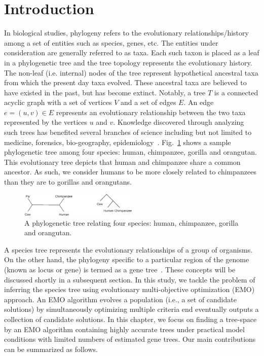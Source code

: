  \section{Introduction}
\label{sec:intro}
In biological studies, phylogeny refers to the evolutionary relationships/history among a set of entities such as species, genes, etc. The entities under consideration are generally referred to as taxa. Each such taxon is placed as a leaf in a phylogenetic tree and the tree topology represents the evolutionary history. The non-leaf (i.e. internal) nodes of the tree represent hypothetical ancestral taxa from which the present day taxa evolved. These ancestral taxa are believed to have existed in the past, but has become extinct. Notably, a tree $T$ is a connected acyclic graph with a set of vertices $V$ and a set of edges $E$. An edge $e = (u, v) \in E$ represents an evolutionary relationship between the two taxa represented by the vertices $u$ and $v$. Knowledge discovered through analyzing such trees has benefited several branches of science including but not limited to medicine, forensics, bio-geography, epidemiology~\cite{felix2015phylogenetics}. 
Fig.~\ref{fig:outgroup} shows a sample phylogenetic tree among four species: human, chimpanzee, gorilla and orangutan. This evolutionary tree depicts that human and chimpanzee share a common ancestor. As such, we consider humans to be more closely related to chimpanzees than they are to gorillas and orangutans.

\begin{figure}[!tb]
	\centering
	\includegraphics[width=0.5\textwidth]{Figure/outgroup.eps}
	\caption{A phylogenetic tree relating four species: human, chimpanzee, gorilla and orangutan. }
	\label{fig:outgroup}
\end{figure}




A species tree represents the evolutionary relationships of a group of organisms. On the other hand, the phylogeny specific to a particular region of the genome (known as locus or gene) is termed as a gene tree~\cite{maddison1997gene}. These concepts will be discussed shortly
in a subsequent section. In this study, we tackle the problem of inferring the species tree using evolutionary multi-objective optimization (EMO) approach. An EMO algorithm evolves a population (i.e., a set of candidate solutions) by simultaneously optimizing multiple criteria end eventually outputs a collection of candidate solutions. In this chapter, we focus on finding a tree-space by an EMO algorithm containing highly accurate trees under practical model conditions with limited numbers of estimated gene trees. Our main contributions can be summarized as follows.


